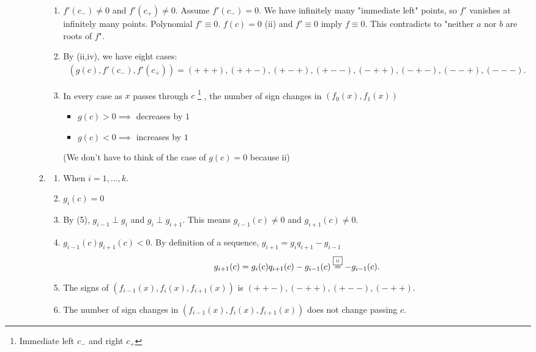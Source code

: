 \documentclass[9pt]{ltjsarticle}
\begin{document}
\begin{itemize}
\begin{enumerate}
\begin{enumerate}
\begin{enumerate}
          \item
          $f'(c_-) \neq 0$ and $f'(c_+) \neq 0$. \pf
          Assume $f'(c_-)=0$.  We have infinitely many "immediate left" points,
          so $f'$ vanishes at infinitely many points. Polynomial $f' \equiv 0$.
          $f(c)=0$ (ii) and $f'\equiv 0$ imply $f\equiv 0$.
          This contradicts to "neither $a$ nor $b$ are roots of $f$".
          \item
          By (ii,iv), we have eight cases:
          \begin{align}
            (g(c),f'(c_-),f'(c_+)) =
            (+++), (++-), (+-+), (+--), (-++), (-+-), (--+), (---).
          \end{align}
          \ie
          \item
          In every case as $x$ passes through $c$
          \footnote{Immediate left $c_-$ and right $c_+$} ,
          the number of sign changes in $(f_0(x),f_1(x))$
          \begin{itemize}
            \item $g(c)>0 \implies$ decreases by $1$
            \item $g(c)<0 \implies$ increases by $1$
          \end{itemize}
          (We don't have to think of the case of $g(c)=0$ because ii)
        \end{enumerate}
        \item
        \begin{enumerate}
          \item When $i=1,\dots,k$.
          \item
          $g_i(c)=0$
          \item
          By (5), $g_{i-1}\perp g_i$ and $g_i \perp g_{i+1}$.
          This means $g_{i-1}(c)\neq 0$ and $g_{i+1}(c)\neq 0$.
          \item
          $g_{i-1}(c)g_{i+1}(c) < 0$. \pf
          By definition of a sequence, $g_{i+1}=g_i q_{i+1} - g_{i-1}$
          \begin{align}
            g_{i+1}(c) = g_i(c) q_{i+1}(c) - g_{i-1}(c) \overset{\text{\fbox{\tiny ii}}}{=} -g_{i-1}(c).
          \end{align}
          \item
          The signs of $(f_{i-1}(x),f_i(x),f_{i+1}(x))$ is
          $(++-),(-++),(+--),(-++)$.
          \item
          The number of sign changes in $(f_{i-1}(x),f_i(x),f_{i+1}(x))$ does not change
          passing $c$.
        \end{enumerate}

\end{enumerate}
\end{enumerate}
\end{itemize}
\end{document}
